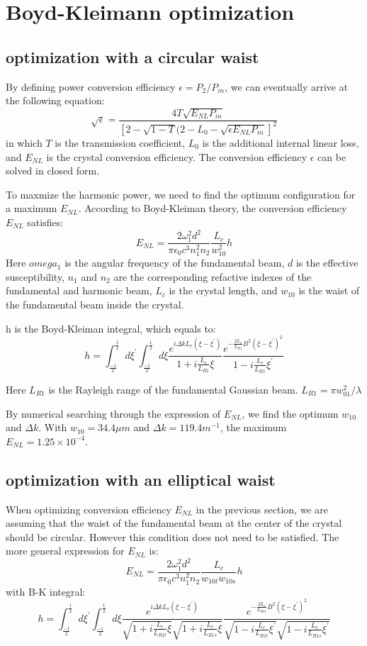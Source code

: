 \documentclass{article}
\begin{document}
\section{Boyd-Kleimann optimization}
\subsection{optimization with a circular waist}
By defining power conversion efficiency $\epsilon=P_2/P_{in}$, we can eventually arrive at the following equation:
$$\sqrt{\epsilon}=\frac{4T\sqrt{E_{NL}P_{in}}}{[2-\sqrt{1-T}(2-L_0-\sqrt{{\epsilon}E_{NL}P_{in}}]^2}$$
in which $T$ is the transmission coefficient, $L_0$ is the additional internal linear loss, and $E_{NL}$ is the crystal conversion efficiency. The conversion efficiency $\epsilon$ can be solved in closed form.

To maxmize the harmonic power, we need to find the optimum configuration for a maximum  $E_{NL}$. According to Boyd-Kleiman theory, the conversion efficiency  $E_{NL}$ satisfies:
$$E_{NL}=\frac{2\omega_1^2d^2}{\pi\epsilon_0c^3n_1^2n_2}\frac{L_c}{w_{10}^2}h$$
Here $omega_1$ is the angular frequency of the fundamental beam, $d$ is the effective susceptibility, $n_1$ and $n_2$ are the corresponding refactive indexes of the fundamental and harmonic beam, $L_c$ is the crystal length, and $w_{10}$ is the waist of the fundamental beam inside the crystal.

h is the Boyd-Kleiman integral, which equals to:
$$h=\int_{\frac{-1}{2}}^{\frac{1}{2}}d\xi^{'}\int_{\frac{-1}{2}}^{\frac{1}{2}}d\xi\frac{e^{i{\Delta}kL_c(\xi-\xi^{'})}}{1+i\frac{L_c}{L_{R1}}\xi}\frac{e^{-\frac{2L_c}{L_{R1}}B^2(\xi-\xi^{'})^2}}{1-i\frac{L_c}{L_{R1}}\xi^{'}}$$

Here $L_{R1}$ is the Rayleigh range of the fundamental Gaussian beam. $L_{R1}={\pi}w_{01}^2/\lambda$

By numerical searching through the expression of $E_{NL}$, we find the optimum $w_{10}$ and ${\Delta}k$. With $w_{10}=34.4{\mu}m$ and ${\Delta}k=119.4m^{-1}$, the maximum $E_{NL}=1.25\times10^{-4}$.

\subsection{optimization with an elliptical waist}
When optimizing conversion efficiency  $E_{NL}$ in the previous section, we are assuming that the waist of the fundamental beam at the center of the crystal should be circular. However this condition does not need to be satisfied. The more general expression for  $E_{NL}$ is:
$$E_{NL}=\frac{2\omega_1^2d^2}{\pi\epsilon_0c^3n_1^2n_2}\frac{L_c}{w_{10t}w_{10s}}h$$
with B-K integral:
$$h=\int_{\frac{-1}{2}}^{\frac{1}{2}}d\xi^{'}\int_{\frac{-1}{2}}^{\frac{1}{2}}d\xi\frac{e^{i{\Delta}kL_c(\xi-\xi^{'})}}{\sqrt{1+i\frac{L_c}{L_{R1t}}\xi}\sqrt{1+i\frac{L_c}{L_{R1s}}\xi}}\frac{e^{-\frac{2L_c}{L_{R1t}}B^2(\xi-\xi^{'})^2}}{\sqrt{1-i\frac{L_c}{L_{R1t}}\xi^{'}}\sqrt{1-i\frac{L_c}{L_{R1s}}\xi^{'}}}$$
\end{document}
